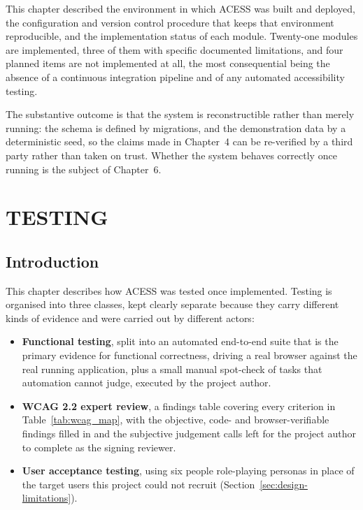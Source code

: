 \documentclass[12pt, oneside]{article} %
\begin{document}
This chapter described the environment in which ACESS was built and deployed, the configuration and version control procedure that keeps that environment reproducible, and the implementation status of each module. Twenty-one modules are implemented, three of them with specific documented limitations, and four planned items are not implemented at all, the most consequential being the absence of a continuous integration pipeline and of any automated accessibility testing.

The substantive outcome is that the system is reconstructible rather than merely running: the schema is defined by migrations, and the demonstration data by a deterministic seed, so the claims made in Chapter~4 can be re-verified by a third party rather than taken on trust. Whether the system behaves correctly once running is the subject of Chapter~6.

\newpage
\section{TESTING}
\label{sec:testing}

\subsection{Introduction}

This chapter describes how ACESS was tested once implemented. Testing is organised into three classes, kept clearly separate because they carry different kinds of evidence and were carried out by different actors:

\begin{itemize}
    \item \textbf{Functional testing}, split into an automated end-to-end suite that is the primary evidence for functional correctness, driving a real browser against the real running application, plus a small manual spot-check of tasks that automation cannot judge, executed by the project author.
    \item \textbf{WCAG 2.2 expert review}, a findings table covering every criterion in Table~\ref{tab:wcag_map}, with the objective, code- and browser-verifiable findings filled in and the subjective judgement calls left for the project author to complete as the signing reviewer.
    \item \textbf{User acceptance testing}, using six people role-playing personas in place of the target users this project could not recruit (Section~\ref{sec:design-limitations}).
\end{itemize}
\end{document}
